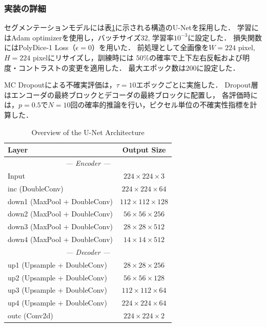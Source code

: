 \documentclass[10pt, a4paper, twocolumn]{jarticle}
\begin{document}
\subsubsection{実装の詳細}
セグメンテーションモデルには表\ref{tab:unet_architecture}に示される構造のU-Net\cite{ronneberger2015u}を採用した．
学習にはAdam optimizer\cite{kingma2014adam}を使用し，バッチサイズ$32$, 学習率$10 ^ {-3}$に設定した．
損失関数にはPolyDice-1 Loss（$\epsilon = 0$）を用いた．
前処理として全画像を$W = 224$ pixel, $H = 224$ pixelにリサイズし，訓練時には
$50\%$の確率で上下左右反転および明度・コントラストの変更を適用した．
最大エポック数は$200$に設定した．

MC Dropoutによる不確実評価は，$\tau=10$エポックごとに実施した．
Dropout層はエンコーダの最終ブロックとデコーダの最終ブロックに配置し，
各評価時には，$p = 0.5$で$N = 10$回の確率的推論を行い，ピクセル単位の不確実性指標を計算した．

\begin{table}[t]
  \centering
  \caption{Overview of the U-Net Architecture}
  \label{tab:unet_architecture}
  \begin{tabular}{lc}
    \toprule
    \textbf{Layer} & \textbf{Output Size} \\
    \midrule
    \multicolumn{2}{c}{\textit{--- Encoder ---}} \\
    Input & $224 \times 224 \times 3$ \\
    inc (DoubleConv) & $224 \times 224 \times 64$\\
    down1 (MaxPool + DoubleConv) & $112 \times 112 \times 128$ \\
    down2 (MaxPool + DoubleConv) & $56 \times 56 \times 256$ \\
    down3 (MaxPool + DoubleConv) & $28 \times 28 \times 512$ \\
    down4 (MaxPool + DoubleConv) & $14 \times 14 \times 512$ \\
    \midrule
    \multicolumn{2}{c}{\textit{--- Decoder ---}} \\
    up1 (Upsample + DoubleConv) & $28 \times 28 \times 256$ \\
    up2 (Upsample + DoubleConv) & $56 \times 56 \times 128$ \\
    up3 (Upsample + DoubleConv) & $112 \times 112 \times 64$ \\
    up4 (Upsample + DoubleConv) & $224 \times 224 \times 64$ \\
    \midrule
    outc (Conv2d) & $224 \times 224 \times 2$ \\
    \bottomrule
  \end{tabular}
\end{table}
\end{document}
